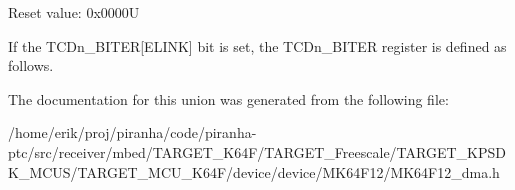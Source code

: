 Reset value\+: 0x0000U

If the T\+C\+Dn\+\_\+\+B\+I\+T\+ER\mbox{[}E\+L\+I\+NK\mbox{]} bit is set, the T\+C\+Dn\+\_\+\+B\+I\+T\+ER register is defined as follows. 

The documentation for this union was generated from the following file\+:\begin{DoxyCompactItemize}
\item 
/home/erik/proj/piranha/code/piranha-\/ptc/src/receiver/mbed/\+T\+A\+R\+G\+E\+T\+\_\+\+K64\+F/\+T\+A\+R\+G\+E\+T\+\_\+\+Freescale/\+T\+A\+R\+G\+E\+T\+\_\+\+K\+P\+S\+D\+K\+\_\+\+M\+C\+U\+S/\+T\+A\+R\+G\+E\+T\+\_\+\+M\+C\+U\+\_\+\+K64\+F/device/device/\+M\+K64\+F12/M\+K64\+F12\+\_\+dma.\+h\end{DoxyCompactItemize}
